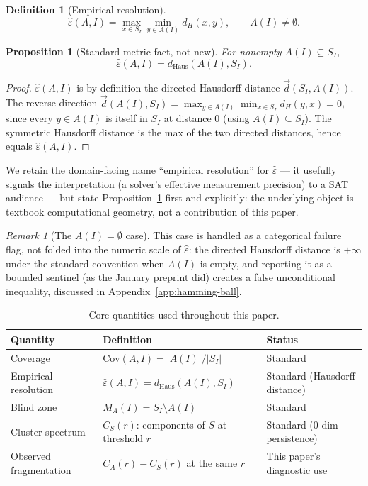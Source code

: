 \documentclass[11pt]{article}
\newtheorem{proposition}[theorem]{Proposition}
\theoremstyle{definition}
\newtheorem{definition}[theorem]{Definition}
\theoremstyle{remark}
\newtheorem{remark}[theorem]{Remark}
\newcommand{\Shat}{S_I}
\newcommand{\Ahat}[1]{A(#1)}
\newcommand{\dH}{d_H}
\newcommand{\dHaus}{d_{\mathrm{Haus}}}
\newcommand{\epshat}{\hat\varepsilon}
\newcommand{\Cov}{\mathrm{Cov}}
\begin{document}
\begin{definition}[Empirical resolution]
\label{def:epshat}
\[
\epshat(A,I) = \max_{x \in \Shat} \min_{y \in \Ahat{I}} \dH(x,y), \qquad \Ahat{I} \neq \emptyset.
\]
\end{definition}

\begin{proposition}[Standard metric fact, not new]
\label{prop:hausdorff}
For nonempty $\Ahat{I} \subseteq \Shat$,
\[
\epshat(A,I) = \dHaus(\Ahat{I}, \Shat).
\]
\end{proposition}

\begin{proof}
$\epshat(A,I)$ is by definition the directed Hausdorff distance $\vec d(\Shat, \Ahat{I})$. The reverse direction $\vec d(\Ahat{I}, \Shat) = \max_{y \in \Ahat{I}} \min_{x \in \Shat} \dH(y,x) = 0$, since every $y \in \Ahat{I}$ is itself in $\Shat$ at distance $0$ (using $\Ahat{I} \subseteq \Shat$). The symmetric Hausdorff distance is the max of the two directed distances, hence equals $\epshat(A,I)$.
\end{proof}

We retain the domain-facing name ``empirical resolution'' for $\epshat$ --- it usefully signals the interpretation (a solver's effective measurement precision) to a SAT audience --- but state Proposition~\ref{prop:hausdorff} first and explicitly: the underlying object is textbook computational geometry, not a contribution of this paper.

\begin{remark}[The $\Ahat{I}=\emptyset$ case]
This case is handled as a categorical failure flag, not folded into the numeric scale of $\epshat$: the directed Hausdorff distance is $+\infty$ under the standard convention when $\Ahat{I}$ is empty, and reporting it as a bounded sentinel (as the January preprint did) creates a false unconditional inequality, discussed in Appendix~\ref{app:hamming-ball}.
\end{remark}

\begin{table}[htbp]
\centering
\caption{Core quantities used throughout this paper.}
\label{tab:definitions}
\begin{tabular}{@{}p{4cm}p{5.7cm}l@{}}
\toprule
Quantity & Definition & Status \\
\midrule
Coverage & $\Cov(A,I) = |\Ahat{I}|/|\Shat|$ & Standard \\
Empirical resolution & $\epshat(A,I) = \dHaus(\Ahat{I},\Shat)$ & Standard (Hausdorff distance) \\
Blind zone & $M_A(I) = \Shat \setminus \Ahat{I}$ & Standard \\
Cluster spectrum & $C_S(r)$: components of $S$ at threshold $r$ & Standard (0-dim persistence) \\
Observed fragmentation & $C_A(r) - C_S(r)$ at the same $r$ & This paper's diagnostic use \\
\bottomrule
\end{tabular}
\end{table}
\end{document}
